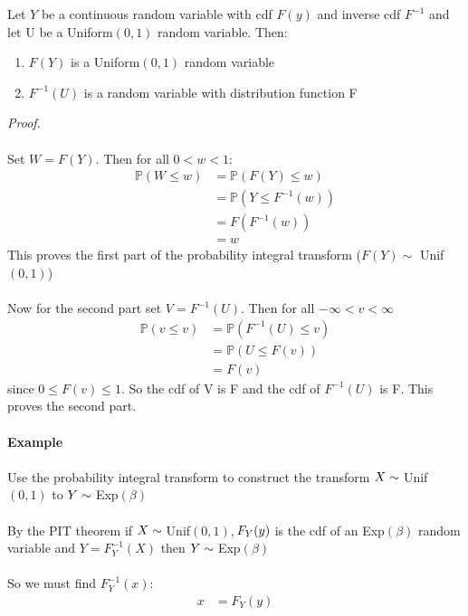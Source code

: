 \documentclass[,oneside]{article}
\begin{document}
\begin{enumerate}
Let $Y$ be a continuous random variable with cdf $F(y)$ and inverse cdf $F^{-1}$ and let U be a Uniform$(0,1)$ random variable. Then:
\begin{enumerate}
\item $F(Y)$ is a Uniform$(0,1)$ random variable 
\item $F^{-1}(U)$ is a random variable with distribution function F
\end{enumerate}
\textit{Proof.}\\ \\
Set $W = F(Y)$. Then for all $0 < w < 1$:
\begin{align*}
\mathbb{P}(W \leq w) &= \mathbb{P}(F(Y) \leq w)\\
&= \mathbb{P}(Y \leq F^{-1}(w))\\
&= F(F^{-1}(w))\\
&= w
\end{align*}
This proves the first part of the probability integral transform ($F(Y) \sim$ Unif$(0,1)$)\\ \\
Now for the second part set $V = F^{-1}(U)$. Then for all $-\infty < v < \infty$
\begin{align*}
\mathbb{P}(v \leq v) &= \mathbb{P}(F^{-1}(U) \leq v)\\
&= \mathbb{P}(U \leq F(v))\\
&= F(v)
\end{align*}
since $0 \leq F(v) \leq 1$. So the cdf of V is F and the cdf of $F^{-1}(U)$ is F. This proves the second part.\\ \\
\textbf{Example}\\ \\
Use the probability integral transform to construct the transform $X \sim \hspace{0.1cm}$Unif$(0,1)$ to $Y \sim \hspace{0.1cm}$Exp$(\beta )$\\ \\
By the PIT theorem if $X \sim \hspace{0.1cm}$Unif$(0,1)$,$\hspace{0.05cm} F_Y(y)$ is the cdf of an Exp$(\beta )$ random variable and $Y = F_Y^{-1}(X)$ then $Y \sim \hspace{0.1cm}$Exp$(\beta )$\\ \\
So we must find $F_Y^{-1}(x):$
\begin{align*}
x&=F_Y(y)\\ 

\end{align*}
\end{enumerate}
\end{document}
